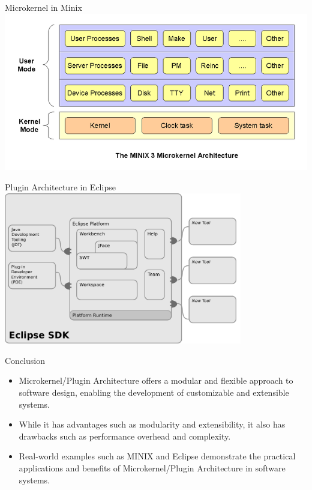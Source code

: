 \documentclass[aspectratio=169, table]{beamer}
\begin{document}
	\begin{frame}{Microkernel in Minix}
		\vspace{20pt}
		\centering
		\includegraphics[width=\textwidth]{../../images/microkernel2}
	\end{frame}	
	
	\begin{frame}{Plugin Architecture in Eclipse}
		\vspace{10pt}
		\centering
		\includegraphics[width=0.78\textwidth]{../../images/plugin1}
	\end{frame}	
	
	\begin{frame}{Conclusion}
		\begin{itemize}
			\item Microkernel/Plugin Architecture offers a modular and flexible approach to software design, enabling the development of customizable and extensible systems.
			\item While it has advantages such as modularity and extensibility, it also has drawbacks such as performance overhead and complexity.
			\item Real-world examples such as MINIX and Eclipse demonstrate the practical applications and benefits of Microkernel/Plugin Architecture in software systems.
		\end{itemize}
	\end{frame}
	
\end{document}

